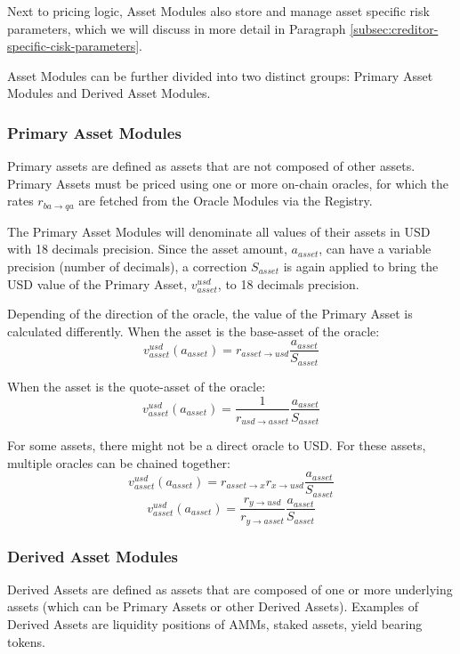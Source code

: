 \documentclass[sigconf,nonacm]{acmart}
\begin{document}
Next to pricing logic, Asset Modules also store and manage asset specific risk parameters, which we will discuss in more detail in Paragraph \ref{subsec:creditor-specific-cisk-parameters}.

Asset Modules can be further divided into two distinct groups: Primary Asset Modules and Derived Asset Modules.

\subsubsection{Primary Asset Modules}
Primary assets are defined as assets that are not composed of other assets.
Primary Assets must be priced using one or more on-chain oracles, for which the rates $r_{ba\rightarrow qa}$ are fetched from the Oracle Modules via the Registry.

The Primary Asset Modules will denominate all values of their assets in USD with 18 decimals precision.
Since the asset amount, $a_{asset}$, can have a variable precision (number of decimals),
a correction $S_{asset}$ is again applied to bring the USD value of the Primary Asset, $v_{asset}^{usd}$, to 18 decimals precision.

Depending of the direction of the oracle, the value of the Primary Asset is calculated differently.
When the asset is the base-asset of the oracle:
\begin{equation}
    v^{usd}_{asset}(a_{asset}) = r_{asset\rightarrow usd} \frac{a_{asset}}{S_{asset}}
\end{equation}

When the asset is the quote-asset of the oracle:
\begin{equation}
    v^{usd}_{asset}(a_{asset}) = \frac{1}{r_{usd\rightarrow asset}} \frac{a_{asset}}{S_{asset}}
\end{equation}

For some assets, there might not be a direct oracle to USD.
For these assets, multiple oracles can be chained together:
\begin{equation}
    v^{usd}_{asset}(a_{asset}) = r_{asset\rightarrow x} r_{x\rightarrow usd} \frac{a_{asset}}{S_{asset}}
\end{equation}
\begin{equation}
    v^{usd}_{asset}(a_{asset}) = \frac{r_{y\rightarrow usd}}{r_{y\rightarrow asset}} \frac{a_{asset}}{S_{asset}}
\end{equation}

\subsubsection{Derived Asset Modules}
Derived Assets are defined as assets that are composed of one or more underlying assets (which can be Primary Assets or other Derived Assets).
Examples of Derived Assets are liquidity positions of AMMs, staked assets, yield bearing tokens.
\end{document}
